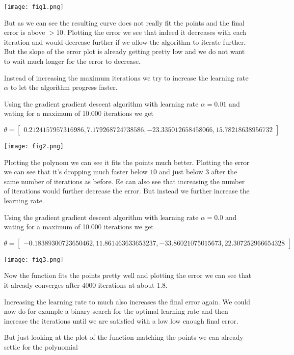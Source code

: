 \documentclass[parskip=half,a4paper]{scrartcl}
\begin{document}
\texttt{[image: fig1.png]}

But as we can see the resulting curve does not really fit the points and the final error is above $>10$. Plotting the error we see that indeed it decreases with each iteration and would decrease further if we allow the algorithm to iterate further. But the slope of the error plot is already getting pretty low and we do not want to wait much longer for the error to decrease.

Instead of increasing the maximum iterations we try to increase the learning rate $\alpha$ to let the algorithm progress faster.

Using the gradient gradient descent algorithm with learning rate $\alpha = 0.01$ and wating for a maximum of 10.000 iterations we get

$$
\theta = \begin{bmatrix}
0.2124157957316986,
7.179268724738586,
-23.335012658458066,
15.78218638956732
\end{bmatrix}
$$

\texttt{[image: fig2.png]}

Plotting the polynom we can see it fits the points much better. Plotting the error we can see that it's dropping much faster below $10$ and just below $3$ after the same number of iterations as before. Ee can also see that increasing the number of iterations would further decrease the error. But instead we further increase the learning rate.

Using the gradient gradient descent algorithm with learning rate $\alpha = 0.0$ and wating for a maximum of 10.000 iterations we get


$$
\theta = \begin{bmatrix}
-0.18389300723650462,
11.861463633653237,
-33.86021075015673,
22.307252966654328
\end{bmatrix}
$$

\texttt{[image: fig3.png]}


Now the function fits the points pretty well and plotting the error we can see that it already converges after 4000 iterations at about $1.8$.

Increasing the learning rate to much also increases the final error again. We could now do for example a binary search for the optimal learning rate and then increase the iterations until we are satisfied with a low low enough final error.

But just looking at the plot of the function matching the points we can already settle for the polynomial
\end{document}
